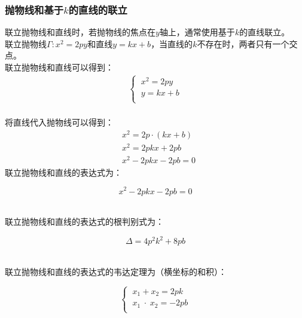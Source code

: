 \documentclass[UTF8]{ctexart}
\begin{document}
\subsubsection{抛物线和基于$k$的直线的联立}
    \setcounter{equation}{0}
    联立抛物线和直线时，若抛物线的焦点在$y$轴上，通常使用基于$k$的直线联立。\\[3mm]
    联立抛物线$\Gamma:x^2=2py$和直线$y=kx+b$，当直线的$k$不存在时，两者只有一个交点。\\[3mm]
    联立抛物线和直线可以得到：
    \begin{align}
        \begin{cases}
            ~x^2=2py\\[1mm]
            ~y=kx+b\\[1mm]
        \end{cases}
    \end{align}\\
    将直线代入抛物线可以得到：
    \begin{align}
        &x^2=2p\cdot(kx+b)\\[3mm]
        &x^2=2pkx+2pb\\[3mm]
        &x^2-2pkx-2pb=0
    \end{align}
    联立抛物线和直线的表达式为：
    \begin{large}
        \begin{equation*}
            x^2-2pkx-2pb=0
        \end{equation*}
    \end{large}\\
    联立抛物线和直线的表达式的根判别式为：
    \begin{large}
        \begin{equation*}
            \Delta=4p^2k^2+8pb
        \end{equation*}
    \end{large}\\
    联立抛物线和直线的表达式的韦达定理为（横坐标的和积）：\vspace{3pt}
    \begin{large}
        \begin{equation*}
            \begin{cases}
                ~x_1+x_2=2pk\\[1mm]
                ~x_1\hspace{3pt}\cdot\hspace{3pt}x_2=-2pb\\[1mm]
            \end{cases}
        \end{equation*}
    \end{large}\\[1mm]
\end{document}
